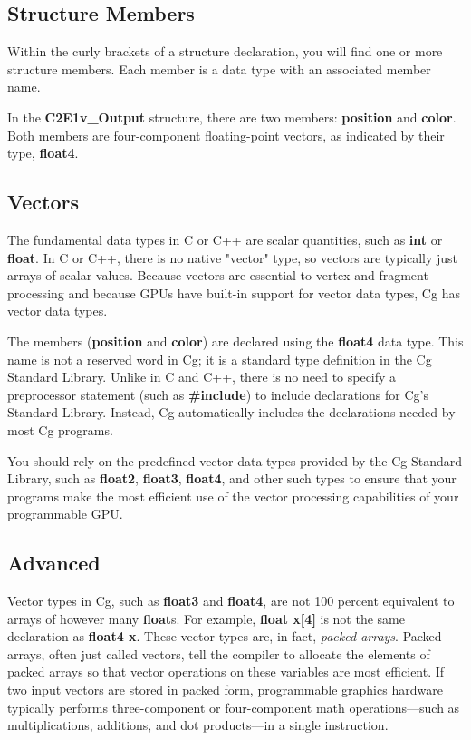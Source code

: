 \documentclass{book}
\begin{document}
\subsection{Structure Members}

Within the curly brackets of a structure declaration, you will find one or more structure members. Each member is a data type with an associated member name.

In the \textbf{C2E1v_Output} structure, there are two members: \textbf{position} and \textbf{color}. Both members are four-component floating-point vectors, as indicated by their type, \textbf{float4}.

\subsection{Vectors}

The fundamental data types in C or C++ are scalar quantities, such as \textbf{int} or \textbf{float}. In C or C++, there is no native "vector" type, so vectors are typically just arrays of scalar values. Because vectors are essential to vertex and fragment processing and because GPUs have built-in support for vector data types, Cg has vector data types.

The members (\textbf{position} and \textbf{color}) are declared using the \textbf{float4} data type. This name is not a reserved word in Cg; it is a standard type definition in the Cg Standard Library. Unlike in C and C++, there is no need to specify a preprocessor statement (such as \textbf{\#include}) to include declarations for Cg's Standard Library. Instead, Cg automatically includes the declarations needed by most Cg programs.

You should rely on the predefined vector data types provided by the Cg Standard Library, such as \textbf{float2}, \textbf{float3}, \textbf{float4}, and other such types to ensure that your programs make the most efficient use of the vector processing capabilities of your programmable GPU.

\subsection*{Advanced}

Vector types in Cg, such as \textbf{float3} and \textbf{float4}, are not 100 percent equivalent to arrays of however many \textbf{float}s. For example, \textbf{float x[4]} is not the same declaration as \textbf{float4 x}. These vector types are, in fact, \textit{packed arrays}. Packed arrays, often just called vectors, tell the compiler to allocate the elements of packed arrays so that vector operations on these variables are most efficient. If two input vectors are stored in packed form, programmable graphics hardware typically performs three-component or four-component math operations—such as multiplications, additions, and dot products—in a single instruction.
\end{document}
